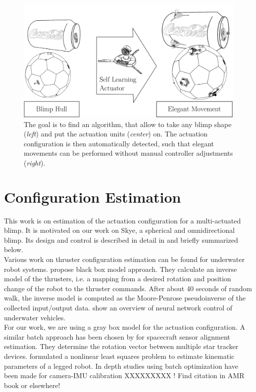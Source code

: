 \begin{figure}[hbtp]
\label{fig:motivation}
\centering
\includegraphics[width=.85\linewidth]{images/motivation.png}
\caption{The goal is to find an algorithm, that allow to take any blimp shape (\textit{left}) and put the actuation units (\textit{center}) on. The actuation configuration is then automatically detected, such that elegant movements can be performed without manual controller adjustments (\textit{right}).}
\end{figure}


\section{Configuration Estimation}
This work is on estimation of the actuation configuration for a multi-actuated blimp.
It is motivated on our work on Skye, a spherical and omnidirectional blimp.
Its design and control is described in detail in \citep{Skye2013} and briefly summarized below. \\
Various work on thruster configuration estimation can be found for underwater robot systems.
\citet{Doniec} propose black box model approach.
They calculate an inverse model of the thrusters, i.e. a mapping from a desired rotation and position change of the robot to the thruster commands. After about 40 seconds of random walk, the inverse model is computed as the Moore-Penrose pseudoinverse of the collected input/output data.
\citet{VandeVen2005} show an overview of neural network control of underwater vehicles. \\ 
For our work, we are using a gray box model for the actuation configuration.
A similar batch approach has been chosen by \citep{Shuster1991} for spacecraft sensor alignment estimation.
They determine the rotation vector between multiple star tracker devices. \citet{Bloesch2013} formulated a nonlinear least squares problem to estimate kinematic parameters of a legged robot.
In depth studies using batch optimization have been made for camera-IMU calibration XXXXXXXXX 
! Find citation in AMR book or elsewhere!


